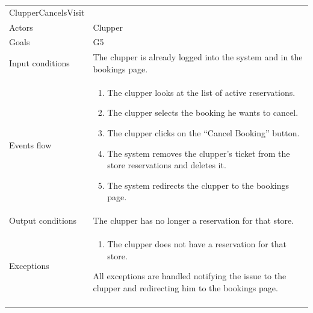 \begin{longtable}[]{@{}
  >{\raggedright\arraybackslash}p{}
  >{\raggedright\arraybackslash}p{}@{}}
\toprule
ClupperCancelsVisit & \\ \addlinespace
\midrule
\endhead
Actors & Clupper \\ \addlinespace
Goals & G5 \\ \addlinespace
Input conditions & The clupper is already logged into the system and in the bookings page. \\ \addlinespace
Events flow & \begin{enumerate}\vspace{-1.35\baselineskip}
    \item The clupper looks at the list of active reservations.
    \item The clupper selects the booking he wants to cancel.
    \item The clupper clicks on the ``Cancel Booking'' button.
    \item The system removes the clupper's ticket from the store reservations and deletes it.
    \item The system redirects the clupper to the bookings page. 
\vspace{-1.0\baselineskip}\end{enumerate} \\ \addlinespace
Output conditions & The clupper has no longer a reservation for that store. \\ \addlinespace
Exceptions & \begin{enumerate}\vspace{-1.35\baselineskip}
    \item The clupper does not have a reservation for that store.
\end{enumerate}All exceptions are handled notifying the issue to the clupper and redirecting him to the bookings page. \\ \addlinespace
\bottomrule
\end{longtable}

